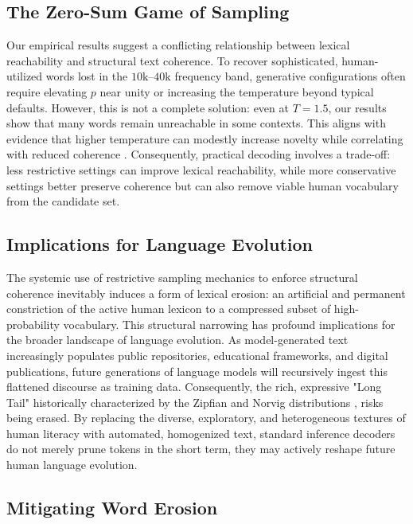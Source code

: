 \documentclass{article}
\begin{document}
\subsection{The Zero-Sum Game of Sampling}

Our empirical results suggest a conflicting relationship between lexical reachability and structural text coherence. To recover sophisticated, human-utilized words lost in the $10\text{k}\text{--}40\text{k}$ frequency band, generative configurations often require elevating $p$ near unity or increasing the temperature beyond typical defaults. However, this is not a complete solution: even at $T=1.5$, our results show that many words remain unreachable in some contexts. This aligns with evidence that higher temperature can modestly increase novelty while correlating with reduced coherence \cite{peeperkorn2024temperature}. Consequently, practical decoding involves a trade-off: less restrictive settings can improve lexical reachability, while more conservative settings better preserve coherence but can also remove viable human vocabulary from the candidate set.


\subsection{Implications for Language Evolution}

The systemic use of restrictive sampling mechanics to enforce structural coherence inevitably induces a form of lexical erosion: an artificial and permanent constriction of the active human lexicon to a compressed subset of high-probability vocabulary. This structural narrowing has profound implications for the broader landscape of  language evolution. As model-generated text increasingly populates public repositories, educational frameworks, and digital publications, future generations of language models will recursively ingest this flattened discourse as training data. Consequently, the rich, expressive "Long Tail" historically characterized by the Zipfian and Norvig distributions \cite{zipf2016human}, \cite{norvig2009} risks being erased. By replacing the diverse, exploratory, and heterogeneous textures of human literacy with automated, homogenized text, standard inference decoders do not merely prune tokens in the short term, they may actively reshape future human language evolution.

\subsection{Mitigating Word Erosion}
\end{document}
